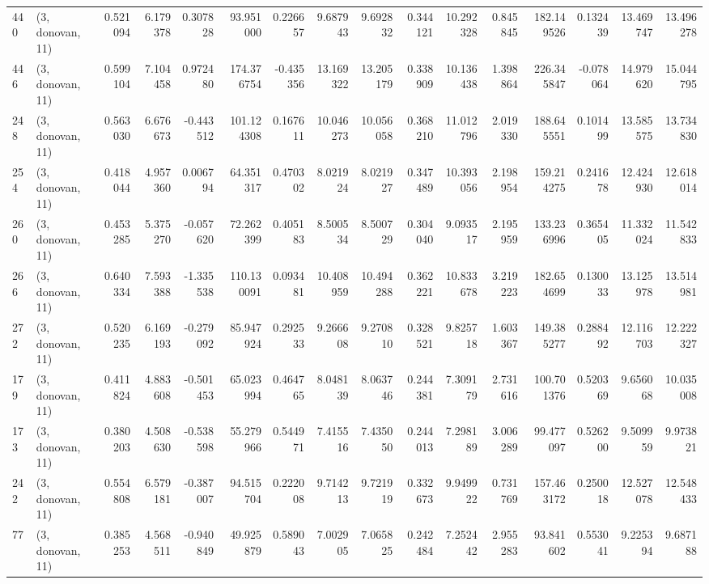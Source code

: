 \begin{tabular}{llrrrrrrrrrrrrrr}
440 &  (3, donovan, 11) &   0.521094 &   6.179378 &   0.307828 &    93.951000 &   0.226657 &   9.687943 &   9.692832 &  0.344121 &  10.292328 &   0.845845 &   182.149526 &  0.132439 &  13.469747 &  13.496278 \\
446 &  (3, donovan, 11) &   0.599104 &   7.104458 &   0.972480 &   174.376754 &  -0.435356 &  13.169322 &  13.205179 &  0.338909 &  10.136438 &   1.398864 &   226.345847 & -0.078064 &  14.979620 &  15.044795 \\
248 &  (3, donovan, 11) &   0.563030 &   6.676673 &  -0.443512 &   101.124308 &   0.167611 &  10.046273 &  10.056058 &  0.368210 &  11.012796 &   2.019330 &   188.645551 &  0.101499 &  13.585575 &  13.734830 \\
254 &  (3, donovan, 11) &   0.418044 &   4.957360 &   0.006794 &    64.351317 &   0.470302 &   8.021924 &   8.021927 &  0.347489 &  10.393056 &   2.198954 &   159.214275 &  0.241678 &  12.424930 &  12.618014 \\
260 &  (3, donovan, 11) &   0.453285 &   5.375270 &  -0.057620 &    72.262399 &   0.405183 &   8.500534 &   8.500729 &  0.304040 &   9.093517 &   2.195959 &   133.236996 &  0.365405 &  11.332024 &  11.542833 \\
266 &  (3, donovan, 11) &   0.640334 &   7.593388 &  -1.335538 &   110.130091 &   0.093481 &  10.408959 &  10.494288 &  0.362221 &  10.833678 &   3.219223 &   182.654699 &  0.130033 &  13.125978 &  13.514981 \\
272 &  (3, donovan, 11) &   0.520235 &   6.169193 &  -0.279092 &    85.947924 &   0.292533 &   9.266608 &   9.270810 &  0.328521 &   9.825718 &   1.603367 &   149.385277 &  0.288492 &  12.116703 &  12.222327 \\
179 &  (3, donovan, 11) &   0.411824 &   4.883608 &  -0.501453 &    65.023994 &   0.464765 &   8.048139 &   8.063746 &  0.244381 &   7.309179 &   2.731616 &   100.701376 &  0.520369 &   9.656068 &  10.035008 \\
173 &  (3, donovan, 11) &   0.380203 &   4.508630 &  -0.538598 &    55.279966 &   0.544971 &   7.415516 &   7.435050 &  0.244013 &   7.298189 &   3.006289 &    99.477097 &  0.526200 &   9.509959 &   9.973821 \\
242 &  (3, donovan, 11) &   0.554808 &   6.579181 &  -0.387007 &    94.515704 &   0.222008 &   9.714213 &   9.721919 &  0.332673 &   9.949922 &   0.731769 &   157.463172 &  0.250018 &  12.527078 &  12.548433 \\
77  &  (3, donovan, 11) &   0.385253 &   4.568511 &  -0.940849 &    49.925879 &   0.589043 &   7.002905 &   7.065825 &  0.242484 &   7.252442 &   2.955283 &    93.841602 &  0.553041 &   9.225394 &   9.687188 \\

\end{tabular}
